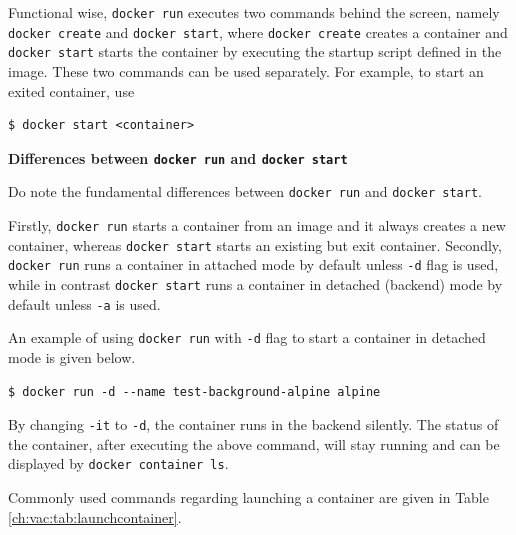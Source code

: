 Functional wise, \verb|docker run| executes two commands behind the screen, namely \verb|docker create| and \verb|docker start|, where \verb|docker create| creates a container and \verb|docker start| starts the container by executing the startup script defined in the image. These two commands can be used separately. For example, to start an exited container, use
\begin{lstlisting}
$ docker start <container>
\end{lstlisting}

\begin{mdframed}
\noindent \textbf{Differences between \texttt{docker run} and \texttt{docker start}}

Do note the fundamental differences between \verb|docker run| and \verb|docker start|. 

Firstly, \verb|docker run| starts a container from an image and it always creates a new container, whereas \verb|docker start| starts an existing but exit container. Secondly, \verb|docker run| runs a container in attached mode by default unless \verb|-d| flag is used, while in contrast \verb|docker start| runs a container in detached (backend) mode by default unless \verb|-a| is used. 
\end{mdframed}

An example of using \verb|docker run| with \verb|-d| flag to start a container in detached mode is given below.
\begin{lstlisting}
$ docker run -d --name test-background-alpine alpine
\end{lstlisting}
By changing \verb|-it| to \verb|-d|, the container runs in the backend silently. The status of the container, after executing the above command, will stay running and can be displayed by \verb|docker container ls|.

Commonly used commands regarding launching a container are given in Table \ref{ch:vac:tab:launchcontainer}.

